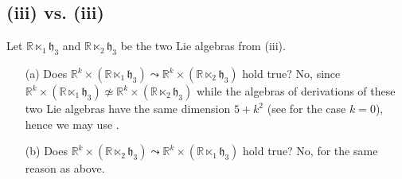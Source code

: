 \documentclass[
reqno]{amsart}
\begin{document}
\subsection{(iii) vs. (iii)}\label{Case8half} 
Let ${{\mathbb R}}\ltimes_1{{\mathfrak h}}_3$ and ${{\mathbb R}}\ltimes_2{{\mathfrak h}}_3$ be the two Lie algebras from (iii). 
\begin{itemize}
\item[(a)] Does ${{\mathbb R}}^k\times({{\mathbb R}}\ltimes_1{{\mathfrak h}}_3){\leadsto}{{\mathbb R}}^k\times({{\mathbb R}}\ltimes_2{{\mathfrak h}}_3)$ hold true? 
No, since 
${{\mathbb R}}^k\times({{\mathbb R}}\ltimes_1{{\mathfrak h}}_3)\not\simeq{{\mathbb R}}^k\times({{\mathbb R}}\ltimes_2{{\mathfrak h}}_3)$ while the algebras of derivations 
of these two Lie algebras have the same dimension $5+k^2$ 
(see \cite[\S VI.B]{NP06} for the case $k=0$), hence we may use \cite[Th. 1(1)]{NP06}.
\item[(b)] Does ${{\mathbb R}}^k\times({{\mathbb R}}\ltimes_2{{\mathfrak h}}_3){\leadsto}{{\mathbb R}}^k\times({{\mathbb R}}\ltimes_1{{\mathfrak h}}_3)$ hold true? 
No, for the same reason as above. 
\end{itemize}
\end{document}
